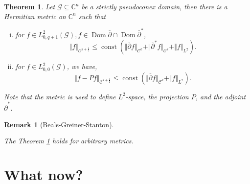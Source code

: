 \documentclass{article}
\newtheorem{theorem}{Theorem} [section]
\newtheorem{remark}{Remark}[section]
\DeclareMathOperator{\Dom}{Dom}
\DeclareMathOperator{\const}{const}
\newcommand{\norm}[1]{\Vert #1 \Vert}
\newcommand{\cC}[0]{\mathcal{C}}
\newcommand{\C}[0]{\mathbb{C}}
\newcommand{\G}[0]{\mathcal{G}}
\newcommand{\cbd}[0]{\overline{\partial}}
\begin{document}
    \begin{theorem}
      \label{theorem_hermitian_metric_holder_norm_inequality}
      Let $\G\subseteq\C^n$ be a strictly pseudoconex domain, then there is a Hermitian metric on $\C^n$ such that 
      \begin{enumerate}[i).]
        \item for $f\in L^2_{0,q+1}(\G),f\in\Dom\cbd\cap\Dom\cbd^*$, 
        \begin{equation*}
          \norm{f}_{\mathcal{C}^{k+{\frac 1 2}}}\leq \const(\norm{\cbd f}_{\mathcal{C}^k}+\norm{\cbd^*f}_{\mathcal{C}^k}+\norm{f}_{L^2}).
        \end{equation*}
        \item for $f\in L_{0,0}^2(\G)$, we have,
        \begin{equation*}
          \norm{f-Pf}_{\cC^{k+{\frac 1 2}}}\leq\const (\norm{\cbd f}_{\cC^k}+\norm{f}_{L^2}).
        \end{equation*}
      \end{enumerate}
      Note that the metric is used to define $L^2$-space, the projection $P$, and the adjoint $\cbd^*$.
    \end{theorem}
    \begin{remark}[Beals-Greiner-Stanton]$\:$
      \par The Theorem \ref{theorem_hermitian_metric_holder_norm_inequality} holds for arbitrary metrics.
    \end{remark}
    \section{What now?}
\end{document}
